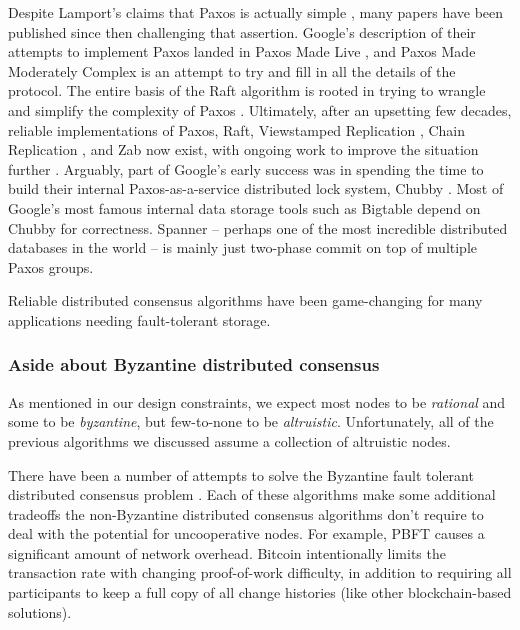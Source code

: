 \documentclass[a4paper,10pt]{article} \usepackage[utf8]{inputenc}
\begin{document}
Despite Lamport's claims that Paxos is actually simple \cite{paxos-simple},
many papers have been published since then
challenging that assertion. Google's description of their attempts to implement
Paxos landed in Paxos Made Live \cite{paxos-live}, and Paxos Made Moderately
Complex \cite{paxos-complex} is an attempt to try and fill in all the details of
the protocol. The entire basis of the Raft algorithm is rooted in trying to
wrangle and simplify the complexity of Paxos \cite{raft}. Ultimately, after an
upsetting few decades, reliable implementations of Paxos, Raft, Viewstamped
Replication \cite{vrr}, Chain Replication \cite{chain-rep}, and Zab \cite{zab}
now exist, with ongoing work to improve the situation
further \cite{epaxos,paxos-flexible}. Arguably, part of Google's early success
was in spending the time to build their internal Paxos-as-a-service distributed
lock system, Chubby \cite{chubby}. Most of Google's most famous internal data
storage tools such as Bigtable \cite{bigtable} depend on Chubby for
correctness. Spanner \cite{spanner} -- perhaps one of the most incredible
distributed databases in the world -- is mainly just two-phase commit on top of
multiple Paxos groups.

Reliable distributed consensus algorithms have been game-changing for many
applications needing fault-tolerant storage.

\subsubsection{Aside about Byzantine distributed consensus}

As mentioned in our design constraints, we expect most nodes to be {\em
rational} and some to be {\em byzantine}, but few-to-none to be {\em
altruistic}. Unfortunately, all of the previous algorithms we discussed assume a
collection of altruistic nodes.

There have been a number of attempts to solve the Byzantine fault tolerant
distributed consensus problem
\cite{bitcoin,pbft,qu,fab,fab-revisited,zyzzyva,rbft,
tangaroa,tendermint,aliph,hashgraph,honeybadger,algorand,casper,
tangle,avalanche,parsec,mickens-bft}. Each of these algorithms make some
additional tradeoffs the non-Byzantine distributed consensus algorithms don't
require to deal with the potential for uncooperative nodes. For example,
PBFT \cite{pbft} causes a significant amount of network overhead. Bitcoin
\cite{bitcoin} intentionally limits the transaction rate with changing
proof-of-work difficulty, in addition to requiring all participants to keep a
full copy of all change histories (like other blockchain-based
solutions).
\end{document}
